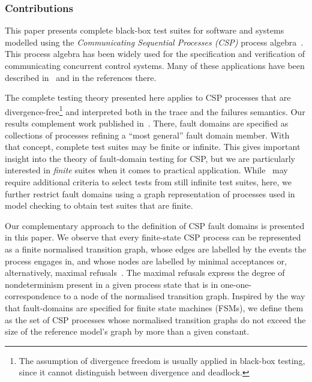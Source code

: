 
\subsubsection*{Contributions}

This paper presents complete black-box test suites for software and systems
modelled using the {\it Communicating Sequential Processes (CSP)} process
algebra~\cite{Hoare:1985:CSP:3921,Roscoe:1997:TPC:550448}. This process
algebra has been widely used for the specification and verification of
communicating concurrent control systems. Many of these applications have
been described in~\cite{Roscoe2010} and in the references there.

The complete testing theory presented here applies to CSP processes that are
divergence-free\footnote{The assumption of divergence freedom is usually
applied in black-box testing, since it cannot distinguish between divergence
and deadlock.} and interpreted both in the trace and the failures semantics.
Our results complement work published in~\cite{DBLP:conf/pts/CavalcantiS17}.
There, fault domains are specified as collections of processes refining a
``most general'' fault domain member. With that concept, complete test suites
may be finite or infinite. This gives important insight into the theory of
fault-domain testing for CSP, but we are particularly interested in {\it
finite} suites when it comes to practical application.
While~\cite{DBLP:conf/pts/CavalcantiS17} may require additional criteria to
select tests from still infinite test suites, here, we further restrict fault
domains using a graph representation of processes used in model checking to
obtain test suites that are finite.

Our complementary approach to the definition of CSP fault domains is
presented in this paper. We observe that every finite-state CSP process can
be represented as a finite normalised transition graph, whose edges are
labelled by the events the process engages in, and whose nodes are labelled
by minimal acceptances or, alternatively, maximal
refusals~\cite{Roscoe:1994:CME:197600}. The maximal refusals express the
degree of nondeterminism present in a given process state that is in
one-one-correspondence to a node of the normalised transition graph. Inspired
by the way that fault-domains are specified for finite state machines (FSMs),
we define them as the set of CSP processes whose normalised transition graphs
do not exceed the size of the reference model's graph by more than a given
constant.

